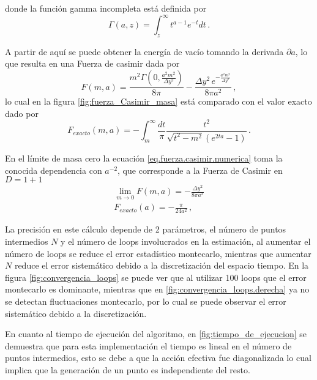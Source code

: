 donde la función gamma incompleta está definida por
\begin{equation*}
\Gamma (a, z) = \int _{z} ^{\infty} t^{a-1} e ^{-t} dt
\, .
\end{equation*}

A partir de aquí se puede obtener la energía de vacío tomando la derivada  $\partial a$, lo que resulta en una Fuerza de casimir dada por
\begin{equation}
F (m,a) = 
\frac{m^2 \Gamma \left( 0 , \frac{a ^2 m^2}{\Delta y^2} \right)}{8 \pi}
- \frac{\Delta y^2 \, e ^ {-\frac{a ^2 m^2}{\Delta y^2}}}{8 \pi a^2 } 
\, ,
\label{eq.fuerza.casimir.numerica}
\end{equation}
lo cual en la figura \eqref{fig:fuerza_Casimir_masa} está comparado con el valor exacto dado por
\begin{equation}
F _{exacto} (m,a) = - \int _{m} ^{ \infty } \frac{dt}{\pi} \frac{t^2}{\sqrt{t^2 -m^2}(e^{2 t a} -1)}
\, .
\end{equation}


En el límite de masa cero la ecuación \eqref{eq.fuerza.casimir.numerica}  toma la conocida dependencia con $a^{-2}$, que corresponde a la Fuerza de Casimir en $D = 1+1$
\begin{align}
\lim _{m \rightarrow 0} F(m,a) = - \frac{\Delta y^2}{8 \pi a^2} \\
F _{exacto} (a) = - \frac{\pi}{24 a^2}
\, ,
\end{align}


La precisión en este cálculo depende de 2 parámetros, el número de puntos intermedios $N$ y el número de loops involucrados en la estimación, al aumentar el número de loops se reduce el error estadístico montecarlo, mientras que aumentar $N$ reduce el error sistemático debido a la discretización del espacio tiempo. En la figura \ref{fig:convergencia_loops} se puede ver que al utilizar  100 loops que el error montecarlo es dominante, mientras que en \ref{fig:convergencia_loops.derecha} ya no se detectan fluctuaciones montecarlo, por lo cual se puede observar el error sistemático debido a la discretización. 


En cuanto al tiempo de ejecución del algoritmo, en \ref{fig:tiempo_de_ejecucion} se demuestra que para esta implementación  el tiempo es lineal en el número de puntos intermedios, esto se debe a que la acción efectiva fue diagonalizada lo cual implica que la generación de un punto es independiente del resto.



